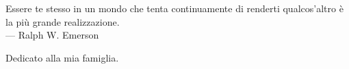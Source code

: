 
\cleardoublepage
{}
\thispagestyle{empty}

\vspace*{3cm}

\begin{center}
Essere te stesso in un mondo che tenta continuamente di renderti qualcos'altro è la più grande realizzazione. \\ \medskip
--- Ralph W. Emerson   
\end{center}

\medskip

\begin{center}
Dedicato alla mia famiglia.
\end{center}
